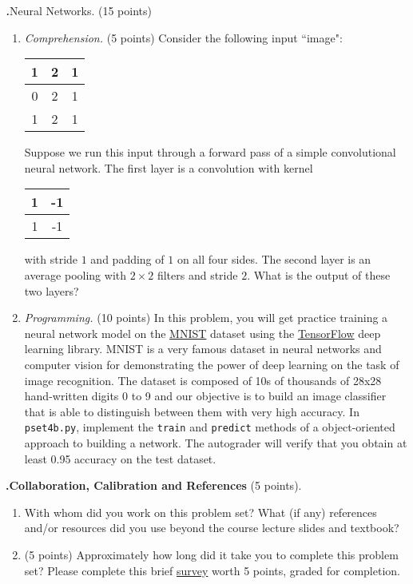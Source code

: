 \documentclass[12pt]{amsart}
\newenvironment{statement}[1]{\smallskip\noindent\color[rgb]{0.0,0.0,0.0} {\bf #1.}}{}
\newcommand{\1}{\mathds{1}}
\begin{document}
\begin{statement}{5}
\textit{Neural Networks.} (15 points)
\begin{enumerate}
    \item \textit{Comprehension.} (5 points) Consider the following input ``image":
    \begin{table}[H]
    \begin{tabular}{|c|c|c|}
    \hline
    1 & 2 & 1 \\ \hline
    0 & 2 & 1 \\ \hline
    1 & 2 & 1 \\ \hline
    \end{tabular}
    \end{table}
    \noindent
    Suppose we run this input through a forward pass of a simple convolutional neural network. The first layer is a convolution with kernel 
    \begin{table}[H]
    \begin{tabular}{|c|c|}
    \hline
    1 & -1 \\ \hline
    1 & -1 \\ \hline
    \end{tabular}
    \end{table}
    \noindent
    with stride $1$ and padding of $1$ on all four sides. The second layer is an average pooling with $2\times 2$ filters and stride $2$. What is the output of these two layers?
    
    \item \textit{Programming.} (10 points) In this problem, you will get practice training a neural network model on the \href{https://en.wikipedia.org/wiki/MNIST_database}{MNIST} dataset using the \href{https://www.tensorflow.org/api_docs/python/tf/keras}{TensorFlow} deep learning library. MNIST is a very famous dataset in neural networks and computer vision for demonstrating the power of deep learning on the task of image recognition. The dataset is composed of 10s of thousands of 28x28 hand-written digits 0 to 9 and our objective is to build an image classifier that is able to distinguish between them with very high accuracy. In \texttt{pset4b.py}, implement the \texttt{train} and \texttt{predict} methods of a object-oriented approach to building a network. The autograder will verify that you obtain at least 0.95 accuracy on the test dataset.
\end{enumerate}
\end{statement}


\newpage
\begin{statement}{6}
\noindent \textbf{Collaboration, Calibration and References} (5 points).
\begin{enumerate}
    \item With whom did you work on this problem set? What (if any) references and/or resources did you use beyond the course lecture slides and textbook? 
    \item (5 points) Approximately how long did it take you to complete this problem set? Please complete this brief \href{https://forms.gle/ZNZXCydWp4Py9Qen6}{survey} worth 5 points, graded for completion.
\end{enumerate}
\end{statement}
\end{document}
